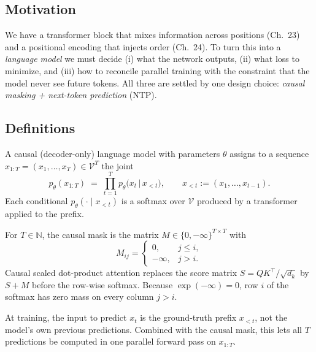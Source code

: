 \subsection*{Motivation}

We have a transformer block that mixes information across positions (Ch.~23) and a positional encoding that injects order (Ch.~24). To turn this into a \emph{language model} we must decide (i) what the network outputs, (ii) what loss to minimize, and (iii) how to reconcile parallel training with the constraint that the model never see future tokens. All three are settled by one design choice: \emph{causal masking + next-token prediction} (NTP).

\subsection*{Definitions}

\begin{definition}
A causal (decoder-only) language model with parameters $\theta$ assigns to a sequence $x_{1:T} = (x_1,\ldots,x_T) \in \mathcal{V}^T$ the joint
\[
  p_\theta(x_{1:T}) \;=\; \prod_{t=1}^{T} p_\theta\!\big(x_t \,\big|\, x_{<t}\big), \qquad x_{<t} := (x_1,\ldots,x_{t-1}).
\]
Each conditional $p_\theta(\cdot\mid x_{<t})$ is a softmax over $\mathcal{V}$ produced by a transformer applied to the prefix.
\end{definition}

\begin{definition}
For $T\in\mathbb{N}$, the causal mask is the matrix $M\in\{0,-\infty\}^{T\times T}$ with
\[
  M_{ij} = \begin{cases} 0, & j \le i,\\ -\infty, & j > i.\end{cases}
\]
Causal scaled dot-product attention replaces the score matrix $S = QK^\top/\sqrt{d_k}$ by $S+M$ before the row-wise softmax. Because $\exp(-\infty)=0$, row $i$ of the softmax has zero mass on every column $j>i$.
\end{definition}

\begin{definition}
At training, the input to predict $x_t$ is the ground-truth prefix $x_{<t}$, not the model's own previous predictions. Combined with the causal mask, this lets all $T$ predictions be computed in one parallel forward pass on $x_{1:T}$.
\end{definition}

